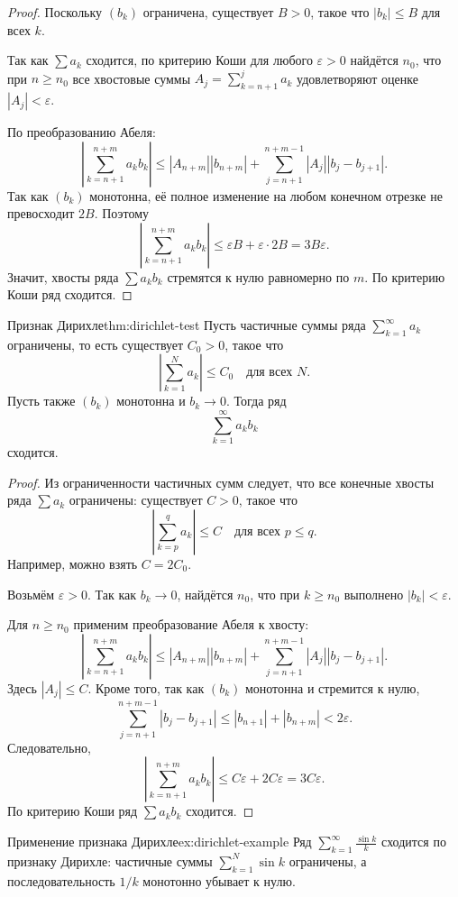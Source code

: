 \begin{proof}
Поскольку \((b_k)\) ограничена, существует \(B>0\), такое что \(|b_k|\le B\) для всех \(k\).

Так как \(\sum a_k\) сходится, по критерию Коши для любого \(\varepsilon>0\) найдётся \(n_0\), что при \(n\ge n_0\) все хвостовые суммы \(A_j=\sum_{k=n+1}^{j}a_k\) удовлетворяют оценке \(|A_j|<\varepsilon\).

По преобразованию Абеля:
\[
\left|\sum_{k=n+1}^{n+m}a_kb_k\right|
\le
|A_{n+m}||b_{n+m}|
+
\sum_{j=n+1}^{n+m-1}|A_j||b_j-b_{j+1}|.
\]
Так как \((b_k)\) монотонна, её полное изменение на любом конечном отрезке не превосходит \(2B\). Поэтому
\[
\left|\sum_{k=n+1}^{n+m}a_kb_k\right|
\le
\varepsilon B+\varepsilon\cdot 2B
=
3B\varepsilon.
\]
Значит, хвосты ряда \(\sum a_kb_k\) стремятся к нулю равномерно по \(m\). По критерию Коши ряд сходится.
\end{proof}

\begin{Theorem}{Признак Дирихле}{thm:dirichlet-test}
	Пусть частичные суммы ряда \(\sum_{k=1}^{\infty}a_k\) ограничены, то есть существует \(C_0>0\), такое что
	\[
	\left|\sum_{k=1}^{N}a_k\right|\le C_0
	\quad \text{для всех } N.
	\]
	Пусть также \((b_k)\) монотонна и \(b_k\to 0\). Тогда ряд
	\[
	\sum_{k=1}^{\infty}a_kb_k
	\]
	сходится.
\end{Theorem}

\begin{proof}
Из ограниченности частичных сумм следует, что все конечные хвосты ряда \(\sum a_k\) ограничены: существует \(C>0\), такое что
\[
\left|\sum_{k=p}^{q}a_k\right|\le C
\quad \text{для всех } p\le q.
\]
Например, можно взять \(C=2C_0\).

Возьмём \(\varepsilon>0\). Так как \(b_k\to 0\), найдётся \(n_0\), что при \(k\ge n_0\) выполнено \(|b_k|<\varepsilon\).

Для \(n\ge n_0\) применим преобразование Абеля к хвосту:
\[
\left|\sum_{k=n+1}^{n+m}a_kb_k\right|
\le
|A_{n+m}||b_{n+m}|
+
\sum_{j=n+1}^{n+m-1}|A_j||b_j-b_{j+1}|.
\]
Здесь \(|A_j|\le C\). Кроме того, так как \((b_k)\) монотонна и стремится к нулю,
\[
\sum_{j=n+1}^{n+m-1}|b_j-b_{j+1}|
\le
|b_{n+1}|+|b_{n+m}|
<2\varepsilon.
\]
Следовательно,
\[
\left|\sum_{k=n+1}^{n+m}a_kb_k\right|
\le
C\varepsilon+2C\varepsilon
=
3C\varepsilon.
\]
По критерию Коши ряд \(\sum a_kb_k\) сходится.
\end{proof}

\begin{Example}{Применение признака Дирихле}{ex:dirichlet-example}
	Ряд \(\sum_{k=1}^{\infty}\frac{\sin k}{k}\) сходится по признаку Дирихле: частичные суммы \(\sum_{k=1}^{N}\sin k\) ограничены, а последовательность \(1/k\) монотонно убывает к нулю.
\end{Example}

